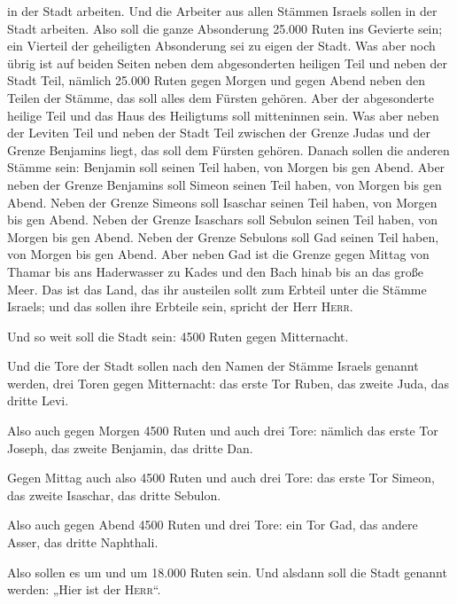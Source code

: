 in der Stadt arbeiten.  Und die Arbeiter aus allen
Stämmen Israels sollen in der Stadt arbeiten.  Also soll
die ganze Absonderung 25.000 Ruten ins Gevierte sein; ein Vierteil der
geheiligten Absonderung sei zu eigen der Stadt.  Was aber
noch übrig ist auf beiden Seiten neben dem abgesonderten heiligen Teil
und neben der Stadt Teil, nämlich 25.000 Ruten gegen Morgen und gegen
Abend neben den Teilen der Stämme, das soll alles dem Fürsten gehören.
Aber der abgesonderte heilige Teil und das Haus des Heiligtums soll
mitteninnen sein.  Was aber neben der Leviten Teil und
neben der Stadt Teil zwischen der Grenze Judas und der Grenze Benjamins
liegt, das soll dem Fürsten gehören.  Danach sollen die
anderen Stämme sein: Benjamin soll seinen Teil haben, von Morgen bis gen
Abend.  Aber neben der Grenze Benjamins soll Simeon
seinen Teil haben, von Morgen bis gen Abend.  Neben der
Grenze Simeons soll Isaschar seinen Teil haben, von Morgen bis gen
Abend.  Neben der Grenze Isaschars soll Sebulon seinen
Teil haben, von Morgen bis gen Abend.  Neben der Grenze
Sebulons soll Gad seinen Teil haben, von Morgen bis gen Abend.
 Aber neben Gad ist die Grenze gegen Mittag von Thamar
bis ans Haderwasser zu Kades und den Bach hinab bis an das große Meer.
 Das ist das Land, das ihr austeilen sollt zum Erbteil
unter die Stämme Israels; und das sollen ihre Erbteile sein, spricht der
Herr \textsc{Herr}.

 Und so weit soll die Stadt sein: 4500 Ruten gegen
Mitternacht.

 Und die Tore der Stadt sollen nach den Namen der Stämme
Israels genannt werden, drei Toren gegen Mitternacht: das erste Tor
Ruben, das zweite Juda, das dritte Levi.

 Also auch gegen Morgen 4500 Ruten und auch drei Tore:
nämlich das erste Tor Joseph, das zweite Benjamin, das dritte Dan.

 Gegen Mittag auch also 4500 Ruten und auch drei Tore:
das erste Tor Simeon, das zweite Isaschar, das dritte Sebulon.

 Also auch gegen Abend 4500 Ruten und drei Tore: ein Tor
Gad, das andere Asser, das dritte Naphthali.

 Also sollen es um und um 18.000 Ruten sein. Und alsdann
soll die Stadt genannt werden: „Hier ist der \textsc{Herr}``.
